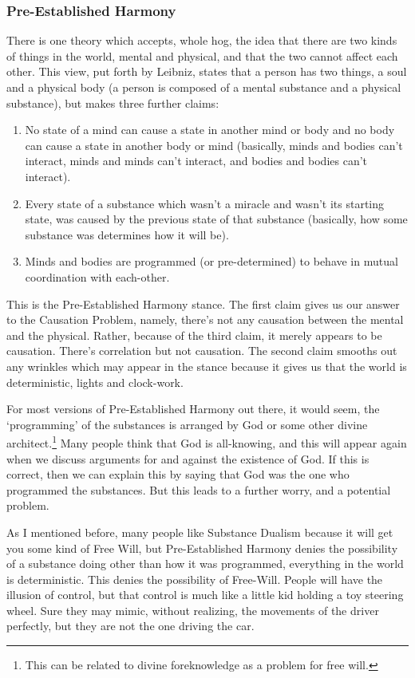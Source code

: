 \subsubsection{Pre-Established Harmony}
There is one theory which accepts, whole hog, the idea that there are two kinds of things in the world, mental and physical, and that the two cannot affect each other. This view, put forth by Leibniz,\autocite[p. 33]{Leibniz2} states that a person has two things, a soul and a physical body (a person is composed of a mental substance and a physical substance), but makes three further claims:
\begin{enumerate}
    \item[]No state of a mind can cause a state in another mind or body and no body can cause a state in another body or mind (basically, minds and bodies can't interact, minds and minds can't interact, and bodies and bodies can't interact).
    \item[]Every state of a substance which wasn't a miracle and wasn't its starting state, was caused by the previous state of that substance (basically, how some substance was determines how it will be).
    \item[]Minds and bodies are programmed (or pre-determined) to behave in mutual coordination with each-other. 
\end{enumerate}
This is the Pre-Established Harmony stance. The first claim gives us our answer to the Causation Problem, namely, there's not any causation between the mental and the physical. Rather, because of the third claim, it merely appears to be causation. There's correlation but not causation. The second claim smooths out any wrinkles which may appear in the stance because it gives us that the world is deterministic, lights and clock-work. 

For most versions of Pre-Established Harmony out there, it would seem, the `programming' of the substances is arranged by God or some other divine architect.\footnote{This can be related to divine foreknowledge as a problem for free will.} Many people think that God is all-knowing, and this will appear again when we discuss arguments for and against the existence of God. If this is correct, then we can explain this by saying that God was the one who programmed the substances. But this leads to a further worry, and a potential problem. 

As I mentioned before, many people like Substance Dualism because it will get you some kind of Free Will, but Pre-Established Harmony denies the possibility of a substance doing other than how it was programmed, everything in the world is deterministic. This denies the possibility of Free-Will. People will have the illusion of control, but that control is much like a little kid holding a toy steering wheel. Sure they may mimic, without realizing, the movements of the driver perfectly, but they are not the one driving the car. 

